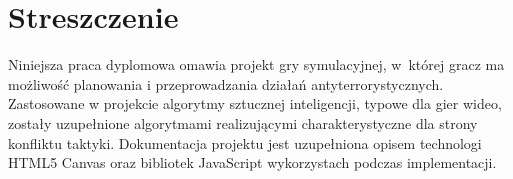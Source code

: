 \chapter*{Streszczenie}
Niniejsza praca dyplomowa omawia projekt gry symulacyjnej, w~której gracz ma możliwość planowania i przeprowadzania działań antyterrorystycznych. Zastosowane w projekcie algorytmy sztucznej inteligencji, typowe dla gier wideo, zostały uzupełnione algorytmami realizującymi charakterystyczne dla strony konfliktu taktyki. Dokumentacja projektu jest uzupełniona opisem technologi HTML5 Canvas oraz bibliotek JavaScript wykorzystach podczas implementacji.
